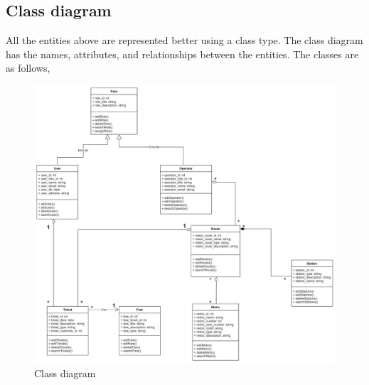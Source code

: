 \documentclass{article}
\begin{document}
\subsection{Class diagram}
All the entities above are represented better using a class type. The class diagram has the names, attributes, and relationships between the entities. The classes are as follows, 
\begin{figure}[h!]
    \includegraphics[scale=0.3]{Class diagram.jpeg}
    \caption{Class diagram}
    \label{fig:class}
\end{figure}\
\pagebreak
\end{document}
